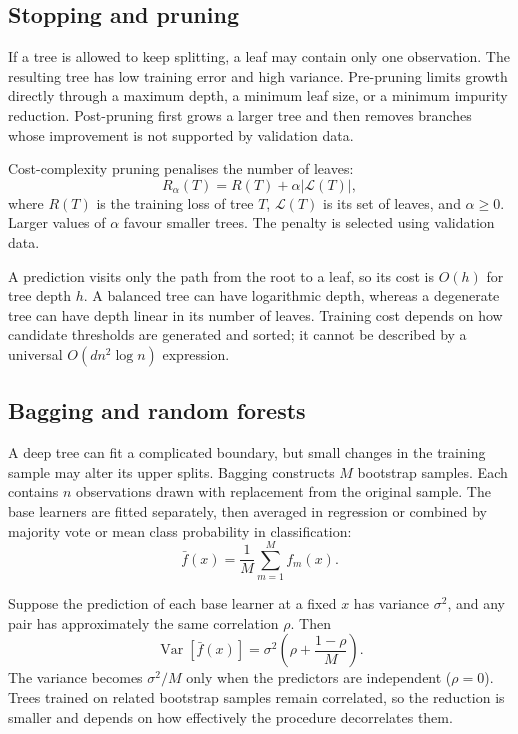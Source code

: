 \subsection{Stopping and pruning}

If a tree is allowed to keep splitting, a leaf may contain only one observation.
The resulting tree has low training error and high variance. Pre-pruning limits
growth directly through a maximum depth, a minimum leaf size, or a minimum
impurity reduction. Post-pruning first grows a larger tree and then removes
branches whose improvement is not supported by validation data.

\DecisionTreeLifecycleFigure

Cost-complexity pruning penalises the number of leaves:
\[
R_\alpha(T)=R(T)+\alpha |\mathcal L(T)|,
\]
where $R(T)$ is the training loss of tree $T$, $\mathcal L(T)$ is its set of
leaves, and $\alpha\ge0$. Larger values of $\alpha$ favour smaller trees. The
penalty is selected using validation data.

A prediction visits only the path from the root to a leaf, so its cost is
$O(h)$ for tree depth $h$. A balanced tree can have logarithmic depth, whereas
a degenerate tree can have depth linear in its number of leaves. Training cost
depends on how candidate thresholds are generated and sorted; it cannot be
described by a universal $O(dn^2\log n)$ expression.

\subsection{Bagging and random forests}

A deep tree can fit a complicated boundary, but small changes in the training
sample may alter its upper splits. Bagging constructs $M$ bootstrap samples.
Each contains $n$ observations drawn with replacement from the original sample.
The base learners are fitted separately, then averaged in regression or combined
by majority vote or mean class probability in classification:
\[
\bar f(x)=\frac1M\sum_{m=1}^{M}f_m(x).
\]

Suppose the prediction of each base learner at a fixed $x$ has variance
$\sigma^2$, and any pair has approximately the same correlation $\rho$. Then
\begin{equation}
\operatorname{Var}[\bar f(x)]
=\sigma^2\left(\rho+\frac{1-\rho}{M}\right).
\label{eq:correlated-ensemble-variance}
\end{equation}
The variance becomes $\sigma^2/M$ only when the predictors are independent
($\rho=0$). Trees trained on related bootstrap samples remain correlated, so
the reduction is smaller and depends on how effectively the procedure
decorrelates them.

